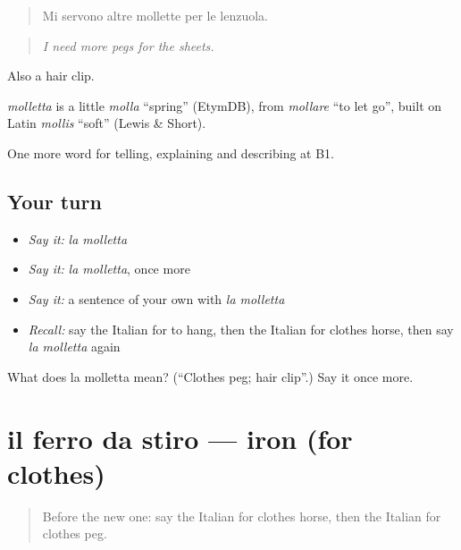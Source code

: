\begin{quote}
Mi servono altre mollette per le lenzuola.
\end{quote}

\begin{quote}
\emph{I need more pegs for the sheets.}
\end{quote}

Also a hair clip.

\begin{cousinweb}
\emph{molletta} is a little \emph{molla} \textquotedblleft{}spring\textquotedblright{} (EtymDB), from \emph{mollare} \textquotedblleft{}to let go\textquotedblright{}, built on Latin \emph{mollis} \textquotedblleft{}soft\textquotedblright{} (Lewis \& Short).
\end{cousinweb}

\begin{grammarlens}[title={What you've built}]
One more word for telling, explaining and describing at B1.
\end{grammarlens}

\subsection*{Your turn}
\begin{itemize}
\raggedright
  \item \emph{Say it:} \emph{la molletta}
  \item \emph{Say it:} \emph{la molletta}, once more
  \item \emph{Say it:} a sentence of your own with \emph{la molletta}
  \item \emph{Recall:} say the Italian for to hang, then the Italian for clothes horse, then say \emph{la molletta} again
\end{itemize}

\begin{tcolorbox}[breakable,colback=teal!4,colframe=teal!35!black,title={Before you move on}]
What does la molletta mean? (\textquotedblleft{}Clothes peg; hair clip\textquotedblright{}.) Say it once more.
\end{tcolorbox}
\section[il ferro da stiro]{il ferro da stiro — iron (for clothes)}

\label{lesson:IT-C531-ferro-da-stiro}



\begin{quote}
Before the new one: say the Italian for clothes horse, then the Italian for clothes peg.
\end{quote}

